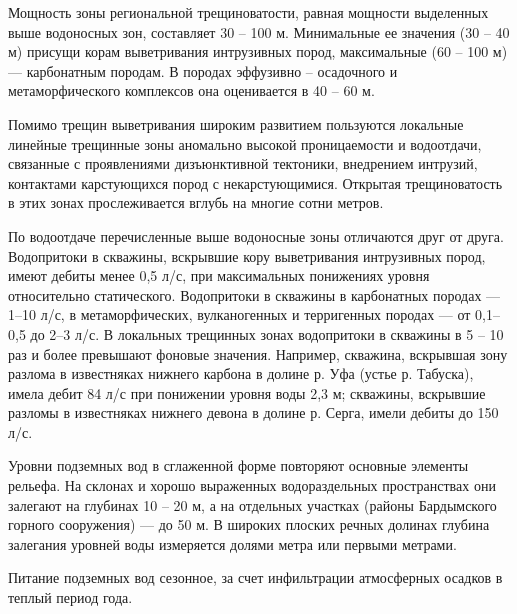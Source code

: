 Мощность зоны региональной трещиноватости, равная мощности выделенных выше водоносных зон, составляет 30 -- 100 м. Минимальные ее значения (30 -- 40 м) присущи корам выветривания интрузивных пород, максимальные (60 -- 100 м)  ---  карбонатным породам. В породах эффузивно -- осадочного и метаморфического комплексов она оценивается в 40 -- 60 м.

Помимо трещин выветривания широким развитием пользуются локальные линейные трещинные зоны аномально высокой проницаемости и водоотдачи,
связанные с проявлениями дизъюнктивной тектоники, внедрением интрузий, контактами карстующихся пород с некарстующимися. Открытая трещиноватость в этих зонах прослеживается вглубь на многие сотни метров.

По водоотдаче перечисленные выше водоносные зоны отличаются друг от друга. Водопритоки в скважины, вскрывшие кору выветривания интрузивных
пород, имеют дебиты менее 0,5 л/с, при максимальных понижениях уровня относительно статического. Водопритоки в скважины в карбонатных породах  --- 1--10 л/с, в метаморфических, вулканогенных и терригенных породах ---  от 0,1--0,5 до 2--3 л/с. В локальных трещинных зонах водопритоки в скважины в 5 -- 10 раз и более превышают фоновые значения. Например, скважина, вскрывшая зону разлома в известняках нижнего карбона в долине р. Уфа
(устье р. Табуска), имела дебит 84 л/с при понижении уровня воды 2,3 м; скважины, вскрывшие разломы в известняках нижнего девона в долине
р. Серга, имели дебиты до 150 л/с. 

Уровни подземных вод в сглаженной форме повторяют основные элементы рельефа. На склонах и хорошо выраженных водораздельных пространствах они залегают на глубинах 10 -- 20 м, а на отдельных участках (районы Бардымского горного сооружения)  ---  до 50 м. В широких плоских речных долинах глубина залегания уровней воды измеряется долями метра или первыми метрами.

Питание подземных вод сезонное, за счет инфильтрации атмосферных осадков в теплый период года.

